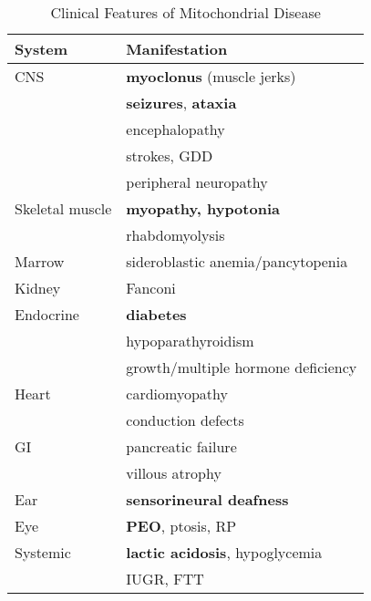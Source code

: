 \documentclass[12pt]{scrartcl}
\begin{document}
\begin{table}[htbp]
\caption{\label{tab:org46c1704}Clinical Features of Mitochondrial Disease}
\centering
\begin{tabular}{ll}
System & Manifestation\\
\hline
CNS & \textbf{myoclonus} (muscle jerks)\\
 & \textbf{seizures}, \textbf{ataxia}\\
 & encephalopathy\\
 & strokes, GDD\\
 & peripheral neuropathy\\
Skeletal muscle & \textbf{myopathy, hypotonia}\\
 & rhabdomyolysis\\
Marrow & sideroblastic anemia/pancytopenia\\
Kidney & Fanconi\\
Endocrine & \textbf{diabetes}\\
 & hypoparathyroidism\\
 & growth/multiple hormone deficiency\\
Heart & cardiomyopathy\\
 & conduction defects\\
GI & pancreatic failure\\
 & villous atrophy\\
Ear & \textbf{sensorineural deafness}\\
Eye & \textbf{PEO}, ptosis, RP\\
Systemic & \textbf{lactic acidosis}, hypoglycemia\\
 & IUGR, FTT\\
\end{tabular}
\end{table}
\end{document}
